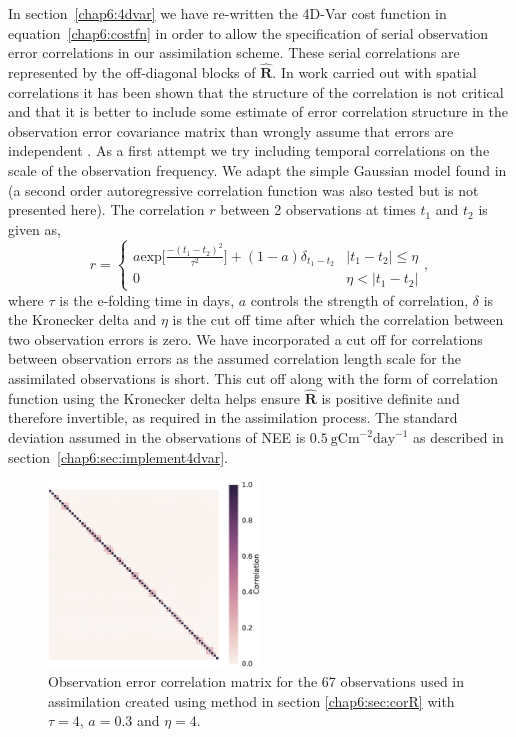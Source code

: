 In section~\ref{chap6:4dvar} we have re-written the 4D-Var cost function in equation~\eqref{chap6:costfn} in order to allow the specification of serial observation error correlations in our assimilation scheme. These serial correlations are represented by the off-diagonal blocks of $\hat{\mathbf{R}}$. In work carried out with spatial correlations it has been shown that the structure of the correlation is not critical and that it is better to include some estimate of error correlation structure in the observation error covariance matrix than wrongly assume that errors are independent \citep{Stewart2013, Healy2005}. As a first attempt we try including temporal correlations on the scale of the observation frequency. We adapt the simple Gaussian model found in \citet{jarvinen1999variational} (a second order autoregressive correlation function was also tested but is not presented here). The correlation $r$ between 2 observations at times $t_1$ and $t_2$ is given as,
\begin{equation}
r =
\begin{cases} 
      a \text{exp} \bigg[ \frac{-(t_1 - t_2)^2}{\tau^2} \bigg] + (1- a)\delta_{t_1 - t_2} & |t_1 - t_2| \leq \eta \\
      0 & \eta < |t_1 - t_2| 
   \end{cases}
   , \label{chap6:eqn:corr_fn}
\end{equation}
where $\tau$ is the e-folding time in days, $a$ controls the strength of correlation, $\delta$ is the Kronecker delta and $\eta$ is the cut off time after which the correlation between two observation errors is zero. We have incorporated a cut off for correlations between observation errors as the assumed correlation length scale for the assimilated observations is short. This cut off along with the form of correlation function using the Kronecker delta helps ensure $\hat{\mathbf{R}}$ is positive definite and therefore invertible, as required in the assimilation process. The standard deviation assumed in the observations of NEE is $0.5~\text{gCm}^{-2}\text{day}^{-1}$ as described in section~\ref{chap6:sec:implement4dvar}.

\begin{figure}[ht]
    \centering
    \includegraphics[width=0.5\textwidth]{chapter/chapter6/rcorcor.eps}
    \caption{Observation error correlation matrix for the 67 observations used in assimilation created using method in section \ref{chap6:sec:corR} with $\tau = 4$, $a=0.3$ and $\eta=4$.}
    \label{chap6:fig:Rcorr}
\end{figure}

